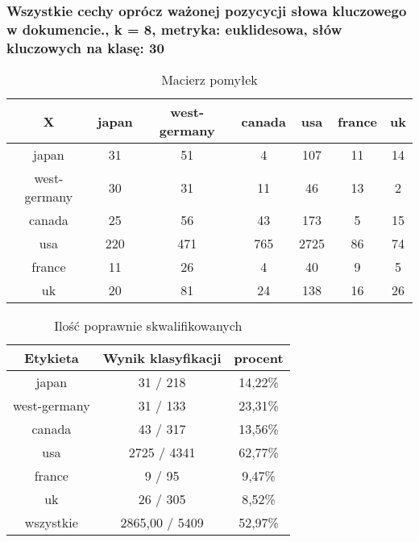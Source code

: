 \documentclass{classrep}
\begin{document}
\newpage
\subsubsection{Wszystkie cechy oprócz ważonej pozycycji słowa kluczowego w dokumencie., k = 8, metryka: euklidesowa, słów kluczowych na klasę: 30}
\begin{table}[h]
\centering
\begin{tabular}{|c|c|c|c|c|c|c|}
\hline
 X  & japan & west-germany & canada & usa & france & uk\\
\hline
japan & 31 & 51 & 4 & 107 & 11 & 14\\
\hline
west-germany & 30 & 31 & 11 & 46 & 13 & 2\\
\hline
canada & 25 & 56 & 43 & 173 & 5 & 15\\
\hline
usa & 220 & 471 & 765 & 2725 & 86 & 74\\
\hline
france & 11 & 26 & 4 & 40 & 9 & 5\\
\hline
uk & 20 & 81 & 24 & 138 & 16 & 26\\
\hline
\end{tabular}
\caption{Macierz pomyłek}\end{table}

\begin{table}[h]
\centering
\begin{tabular}{|c|c|c|}
\hline
Etykieta & Wynik klasyfikacji & procent\\
\hline
japan & 31 / 218 & 14,22\%\\
\hline
west-germany & 31 / 133 & 23,31\%\\
\hline
canada & 43 / 317 & 13,56\%\\
\hline
usa & 2725 / 4341 & 62,77\%\\
\hline
france & 9 / 95 & 9,47\%\\
\hline
uk & 26 / 305 & 8,52\%\\
\hline
wszystkie & 2865,00 / 5409 & 52,97\%\\
\hline
\end{tabular}
\caption{Ilość poprawnie skwalifikowanych}\end{table}


\newpage
\end{document}
